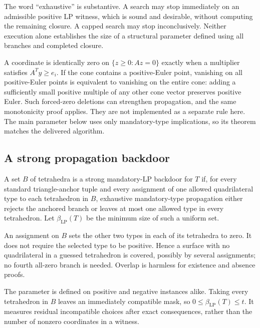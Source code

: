 The word ``exhaustive'' is substantive. A search may stop immediately on an admissible positive LP witness, which is sound and desirable, without computing the remaining closure. A capped search may stop inconclusively. Neither execution alone establishes the size of a structural parameter defined using all branches and completed closure.

\begin{remark}
A coordinate is identically zero on $\{z\ge0:Az=0\}$ exactly when a multiplier satisfies $A^Ty\ge e_i$. If the cone contains a positive-Euler point, vanishing on all positive-Euler points is equivalent to vanishing on the entire cone: adding a sufficiently small positive multiple of any other cone vector preserves positive Euler. Such forced-zero deletions can strengthen propagation, and the same monotonicity proof applies. They are not implemented as a separate rule here. The main parameter below uses only mandatory-type implications, so its theorem matches the delivered algorithm.
\end{remark}

\subsection{A strong propagation backdoor}

\begin{definition}\label{def:backdoor}
A set $B$ of tetrahedra is a strong mandatory-LP backdoor for $T$ if, for every standard triangle-anchor tuple and every assignment of one allowed quadrilateral type to each tetrahedron in $B$, exhaustive mandatory-type propagation either rejects the anchored branch or leaves at most one allowed type in every tetrahedron. Let $\beta_{\mathrm{LP}}(T)$ be the minimum size of such a uniform set.
\end{definition}

An assignment on $B$ sets the other two types in each of its tetrahedra to zero. It does not require the selected type to be positive. Hence a surface with no quadrilateral in a guessed tetrahedron is covered, possibly by several assignments; no fourth all-zero branch is needed. Overlap is harmless for existence and absence proofs.

The parameter is defined on positive and negative instances alike. Taking every tetrahedron in $B$ leaves an immediately compatible mask, so $0\le\beta_{\mathrm{LP}}(T)\le t$. It measures residual incompatible choices after exact consequences, rather than the number of nonzero coordinates in a witness.

